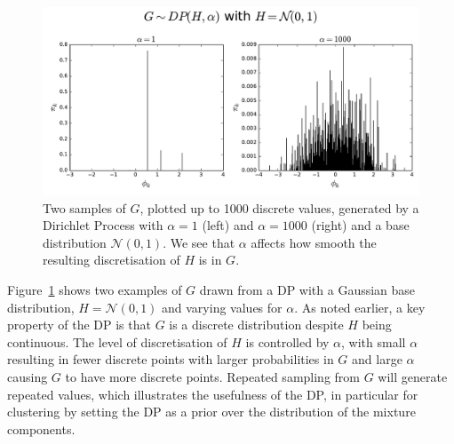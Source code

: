 \begin{figure}
\noindent \begin{centering}
\includegraphics[width=1.0\textwidth]{03-machine-learning/figures/dp_samples_stick.pdf}
\par\end{centering}
\caption[Two samples of $G$, plotted up to 1000 discrete values, generated by a Dirichlet Process.]{\label{fig:g-from-dp-stick}Two samples of $G$, plotted up to 1000 discrete values, generated by a Dirichlet Process with $\alpha=1$ (left) and $\alpha=1000$ (right) and a base distribution $\mathcal{N}(0, 1)$. We see that $\alpha$ affects how smooth the resulting discretisation of $H$ is in $G$.}
\end{figure}

Figure~\ref{fig:g-from-dp-stick} shows two examples of $G$ drawn from a DP with a Gaussian base distribution, $H=\mathcal{N}(0, 1)$ and varying values for $\alpha$. As noted earlier, a key property of the DP is that $G$ is a discrete distribution despite $H$ being continuous. The level of discretisation of $H$ is controlled by $\alpha$, with small $\alpha$ resulting in fewer discrete points with larger probabilities in $G$ and large $\alpha$ causing $G$ to have more discrete points. Repeated sampling from $G$ will generate repeated values, which illustrates the usefulness of the DP, in particular for clustering by setting the DP as a prior over the distribution of the mixture components. 

